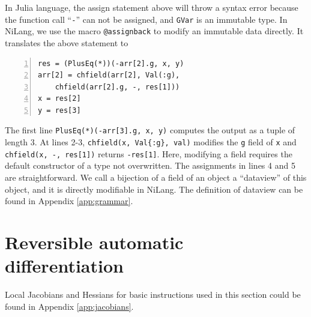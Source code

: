 \documentclass[aps,twocolumn,longbibliography,english,superscriptaddress]{revtex4-1}
\newcommand{\<}{\langle}
\renewcommand{\>}{\rangle}
\newcommand{\App}[1]{Appendix \ref{#1}}
\theoremstyle{definition}\newtheorem{definition}{\textit{Definition}}
\begin{document}
In Julia language, the assign statement above will throw a syntax error because the function call ``\texttt{-}'' can not be assigned, and \texttt{GVar} is an immutable type.
In NiLang, we use the macro \texttt{@assignback} to modify an immutable data directly. It translates the above statement to

\begin{minipage}{.44\textwidth}
\begin{lstlisting}[numberstyle=\scriptsize\color{gray},numbers=left,numbersep=8pt]
res = (PlusEq(*))(-arr[2].g, x, y)
arr[2] = chfield(arr[2], Val(:g),
    chfield(arr[2].g, -, res[1]))
x = res[2]
y = res[3]
\end{lstlisting}
\end{minipage}

The first line \texttt{PlusEq(*)(-arr[3].g, x, y)} computes the output as a tuple of length $3$.
At lines 2-3, \texttt{chfield(x, Val\{:g\}, val)} modifies the \texttt{g} field of \texttt{x} and \texttt{chfield(x, -, res[1])} returns \texttt{-res[1]}. Here, modifying a field requires the default constructor of a type not overwritten.
The assignments in lines 4 and 5 are straightforward.
We call a bijection of a field of an object a ``dataview'' of this object, and it is directly modifiable in NiLang.
The definition of dataview can be found in \App{app:grammar}.

\section{Reversible automatic differentiation}\label{sec:bp}

Local Jacobians and Hessians for basic instructions used in this section could be found in \App{app:jacobians}.
\end{document}
